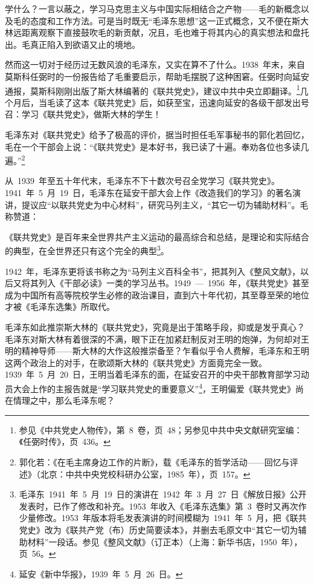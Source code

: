 学什么？一言以蔽之，学习马克思主义与中国实际相结合之产物——毛的新概念以及毛的态度和工作方法。可是当时既无“毛泽东思想”这一正式概念，又不便在斯大林远距离观察下直接鼓吹毛的新贡献，况且，毛也难于将其内心的真实想法和盘托出。毛真正陷入到欲语又止的境地。

然而这一切对于经历过无数风浪的毛泽东，又实在算不了什么。1938~年末，来自莫斯科任弼时的一份报告给了毛重要启示，帮助毛摆脱了这种困窘。任弼时向延安通报，莫斯科刚刚出版了斯大林编著的《联共党史》，建议中共中央立即翻译。\footnote{参见《中共党史人物传》，第~8~卷，页~48；另参见中共中央文献研究室编：《任弼时传》，页~436。}几个月后，当毛读了这本《联共党史》后，如获至宝，迅速向延安的各级干部发出号召：学习《联共党史》，做斯大林的学生！

毛泽东对《联共党史》给予了极高的评价，据当时担任毛军事秘书的郭化若回忆，毛在一个干部会上说：“《联共党史》是本好书，我已读了十遍。奉劝各位也多读几遍。”\footnote{郭化若：《在毛主席身边工作的片断》，载《毛泽东的哲学活动——回忆与评述》（北京：中共中央党校科研办公室，1985~年），页~157。}

从~1939~年至五十年代末，毛泽东不下十数次号召全党学习《联共党史》。1941~年~5~月~19~日，毛泽东在延安干部大会上作《改造我们的学习》的著名演讲，提议应“以联共党史为中心材料”，研究马列主义，“其它一切为辅助材料”。毛称赞道：

\begin{quoting}
《联共党史》是百年来全世界共产主义运动的最高综合和总结，是理论和实际结合的典型，在全世界还只有这个完全的典型\footnote{毛泽东~1941~年~5~月~19~日的演讲在~1942~年~3~月~27~日《解放日报》公开发表时，已作了修改和补充。1953~年收入《毛泽东选集》第~3~卷时又再次作少量修改。1953~年版本将毛发表演讲的时间模糊为~1941~年~5~月，把《联共党史》改为《联共产党（布）历史简要读本》，并删去毛原文中“其它一切为辅助材料”一段话。参见《整风文献》（订正本）（上海：新华书店，1950~年），页~56。}。
\end{quoting}

1942~年，毛泽东更将该书称之为“马列主义百科全书”，把其列入《整风文献》，以后又将其列入《干部必读》一类的学习丛书。1949~—~1956~年，《联共党史》甚至成为中国所有高等院校学生必修的政治课目，直到六十年代初，其至尊至荣的地位才被《毛泽东选集》所取代。

毛泽东如此推崇斯大林的《联共党史》，究竟是出于策略手段，抑或是发乎真心？毛泽东对斯大林有着很深的不满，眼下正在加紧赶制反对王明的炮弹，为何却对王明的精神导师——斯大林的大作这般推崇备至？乍看似乎令人费解，毛泽东和王明这两个政治上的对手，在歌颂斯大林的《联共党史》方面竟完全一致。1939~年~5~月~20~日，王明当着毛泽东的面，在延安召开的中央干部教育部学习动员大会上作的主报告就是“学习联共党史的重要意义”\footnote{延安《新中华报》，1939~年~5~月~26~日。}，王明偏爱《联共党史》尚在情理之中，那么毛泽东呢？

